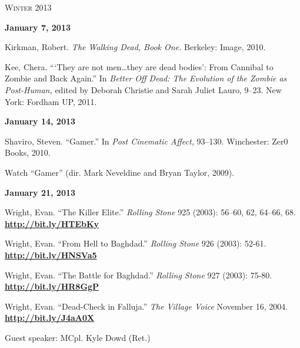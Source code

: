 \documentclass[12pt]{article}
\begin{document}
\vspace{.125in}

\begin{center}
{\Large \textsc{Winter 2013}}
\end{center}

\vspace{.125in}

\textbf{January 7, 2013}

\begin{hangparas}{.5in}{1}
Kirkman, Robert. \textit{The Walking Dead, Book One.} Berkeley: Image, 2010.

Kee, Chera. ```They are not men\ldots they are dead bodies': From Cannibal to Zombie and Back Again.'' In \textit{Better Off Dead: The Evolution of the Zombie as Post-Human,} edited by Deborah Christie and Sarah Juliet Lauro, 9--23. New York: Fordham UP, 2011. 
\end{hangparas}

\textbf{January 14, 2013}

\begin{hangparas}{.5in}{1}
Shaviro, Steven. ``Gamer.'' In \textit{Post Cinematic Affect,} 93--130. Winchester: Zer0 Books, 2010.

Watch ``Gamer'' (dir. Mark Neveldine and Bryan Taylor, 2009).
\end{hangparas}

\textbf{January 21, 2013}

\begin{hangparas}{.5in}{1}
Wright, Evan. ``The Killer Elite.'' \textit{Rolling Stone} 925 (2003): 56--60, 62, 64--66, 68.\\ \href{http://bit.ly/HTEbKy }{\textbf{http://bit.ly/HTEbKy}}

Wright, Evan. ``From Hell to Baghdad.'' \textit{Rolling Stone} 926 (2003): 52-61.\\ \href{http://bit.ly/HNSVa5}{\textbf{http://bit.ly/HNSVa5}}

Wright, Evan. ``The Battle for Baghdad.'' \textit{Rolling Stone} 927 (2003): 75-80.\\ \href{http://bit.ly/HR8GgP}{\textbf{http://bit.ly/HR8GgP}}

Wright, Evan. ``Dead-Check in Falluja.'' \textit{The Village Voice} November 16, 2004.\\ \href{http://bit.ly/J4aA0X}{\textbf{http://bit.ly/J4aA0X}}

Guest speaker: MCpl. Kyle Dowd (Ret.)
\end{hangparas}
\end{document}
